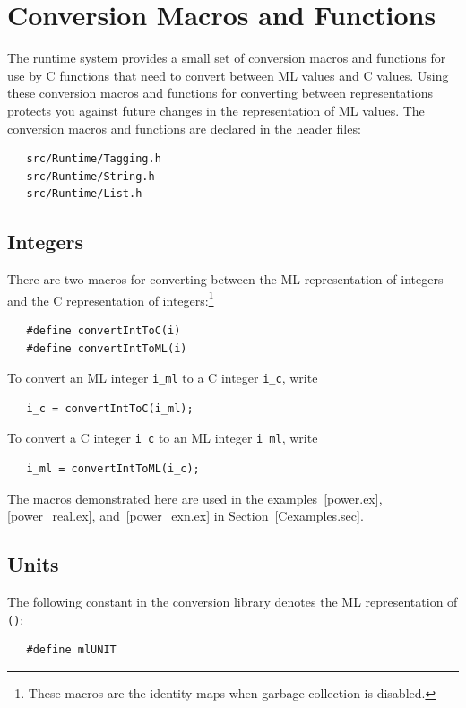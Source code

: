 \documentclass[12pt]{book}
\begin{document}
\section{Conversion Macros and Functions}
The runtime system provides a small set of conversion macros and
functions for use by C functions that need to convert between ML
values and C values. Using these conversion macros and functions for
converting between representations protects you against future
changes in the representation of ML values. The conversion macros and
functions are declared in the header
files:
\begin{verbatim}
   src/Runtime/Tagging.h
   src/Runtime/String.h
   src/Runtime/List.h
\end{verbatim}

\subsection{Integers}
There are two macros for converting between the ML representation of
integers and the C representation of integers:\footnote{These macros are the identity maps when garbage collection is disabled.}
%
%
\begin{verbatim}
   #define convertIntToC(i)
   #define convertIntToML(i)
\end{verbatim}
To convert an ML integer \verb|i_ml| to a C integer \verb|i_c|,
write 
\begin{verbatim}
   i_c = convertIntToC(i_ml);
\end{verbatim}
To convert a C integer \verb|i_c| to an ML
 integer \verb|i_ml|, write
\begin{verbatim}
   i_ml = convertIntToML(i_c);
\end{verbatim}
The macros demonstrated here are used in the examples~\ref{power.ex},
\ref{power_real.ex}, and~\ref{power_exn.ex} in Section~\ref{Cexamples.sec}.

\subsection{Units}
The following constant in the conversion library denotes the ML
representation of {\tt ()}:
%
\begin{verbatim}
   #define mlUNIT
\end{verbatim}
\end{document}
